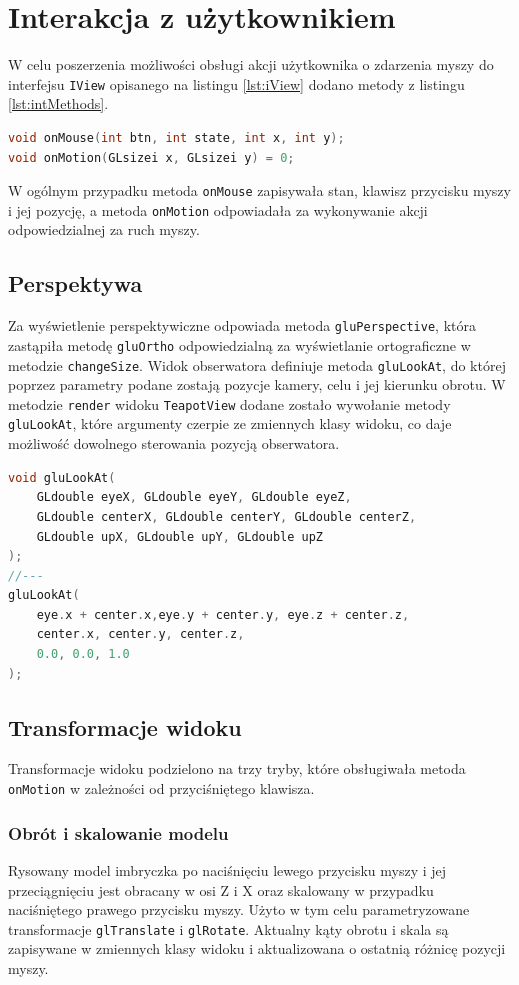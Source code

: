\newpage
\section{Interakcja z użytkownikiem}
W celu poszerzenia możliwości obsługi akcji użytkownika o zdarzenia myszy do interfejsu \lstinline{IView} opisanego na listingu \ref{lst:iView} dodano metody z listingu \ref{lst:intMethods}.

\begin{lstlisting}[language=C++, caption=Metody interfejsu IView do obsługi zdarzeń myszy., label={lst:intMethods}]
void onMouse(int btn, int state, int x, int y);
void onMotion(GLsizei x, GLsizei y) = 0;
\end{lstlisting}
W ogólnym przypadku metoda \lstinline{onMouse} zapisywała stan, klawisz przycisku myszy i jej pozycję, a metoda \lstinline{onMotion} odpowiadała za wykonywanie akcji odpowiedzialnej za ruch myszy.
\subsection{Perspektywa}
Za wyświetlenie perspektywiczne odpowiada metoda \lstinline{gluPerspective}, która zastąpiła metodę \lstinline{gluOrtho} odpowiedzialną za wyświetlanie ortograficzne w metodzie \lstinline{changeSize}. Widok obserwatora definiuje metoda \lstinline{gluLookAt}, do której poprzez parametry podane zostają pozycje kamery, celu i jej kierunku obrotu. W metodzie \lstinline{render} widoku \lstinline{TeapotView} dodane zostało wywołanie metody \lstinline{gluLookAt}, które argumenty czerpie ze zmiennych klasy widoku, co daje możliwość dowolnego sterowania pozycją obserwatora.
\begin{lstlisting}[language=C++, caption=Definicja i wywołanie metody \lstinline{gluLookAt}., label={lst:intGluLookAt}]
void gluLookAt(
    GLdouble eyeX, GLdouble eyeY, GLdouble eyeZ,
    GLdouble centerX, GLdouble centerY, GLdouble centerZ,
    GLdouble upX, GLdouble upY, GLdouble upZ
);
//---
gluLookAt(
    eye.x + center.x,eye.y + center.y, eye.z + center.z,
    center.x, center.y, center.z,
    0.0, 0.0, 1.0
);
\end{lstlisting}
\subsection{Transformacje widoku}
Transformacje widoku podzielono na trzy tryby, które obsługiwała metoda \lstinline{onMotion} w zależności od przyciśniętego klawisza.
\subsubsection{Obrót i skalowanie modelu}
Rysowany model imbryczka po naciśnięciu lewego przycisku myszy i jej przeciągnięciu jest obracany w osi Z i X oraz skalowany w przypadku naciśniętego prawego przycisku myszy. Użyto w tym celu parametryzowane transformacje \lstinline{glTranslate} i \lstinline{glRotate}. Aktualny kąty obrotu i skala są zapisywane w zmiennych klasy widoku i aktualizowana o ostatnią różnicę pozycji myszy.
